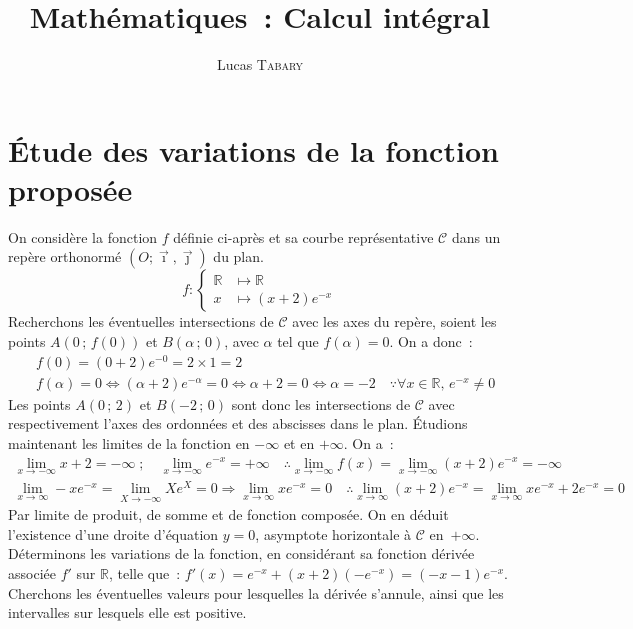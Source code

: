 \documentclass{article}
\title{\textbf{Mathématiques~: Calcul intégral}}
\author{Lucas \textsc{Tabary}}
\date{}
\begin{document}
 \maketitle
 \hrulefill

 \vspace{2cm}

 \hrulefill

\section{Étude des variations de la fonction proposée}
    On considère la fonction $f$ définie ci-après et sa courbe représentative $\mathscr{C}$ dans un repère orthonormé $(O;\vec\imath,\vec\jmath)$ du plan.
    \begin{displaymath}
        f:  \left\{
            \begin{array}{ll}
             \mathbb{R} \!&\mapsto \mathbb{R} \\
             x \!&\mapsto (x+2)e^{-x}
            \end{array}
            \right.
    \end{displaymath}
    Recherchons les éventuelles intersections de $\mathscr{C}$ avec les axes du repère, soient les points $A(0\,;\,f(0))$ et $B(\alpha\,;\,0)$, avec $\alpha$ tel que $f(\alpha) = 0$. On a donc~:
    \begin{align*}
     &f(0) = (0+2)e^{-0} = 2\times 1 = 2 \\
     &f(\alpha) = 0 \Leftrightarrow (\alpha + 2)e^{-\alpha}=0 \Leftrightarrow \alpha + 2 = 0\Leftrightarrow\alpha =-2\quad\because\forall x\in\mathbb{R},\, e^{-x}\neq 0
    \end{align*}
    Les points $A(0\,;\,2)$ et $B(-2\,;\,0)$ sont donc les intersections de $\mathscr{C}$ avec respectivement l'axes des ordonnées et des abscisses dans le plan. Étudions maintenant les limites de la fonction en $-\infty$ et en $+\infty$. On a~:
    \begin{gather*}
     \lim_{x\to -\infty} x+2 = -\infty\;;\quad \lim_{x \to -\infty} e^{-x} = +\infty\quad\therefore\lim_{x \to -\infty} f(x) = \lim_{x \to -\infty} (x+2)e^{-x} = -\infty \\
     \lim_{x\to \infty} -xe^{-x} = \lim_{X\to -\infty} Xe^X = 0 \Rightarrow \lim_{x\to \infty} xe^{-x} = 0\quad\therefore\lim_{x\to\infty} (x+2)e^{-x} = \lim_{x\to\infty} xe^{-x}+2e^{-x} = 0
    \end{gather*}
    Par limite de produit, de somme et de fonction composée. On en déduit l'existence d'une droite d'équation $y=0$, asymptote horizontale à $\mathscr{C}$ en~$+\infty$. Déterminons les variations de la fonction, en considérant sa fonction dérivée associée $f'$ sur $\mathbb{R}$, telle que~: $f'(x)=e^{-x} +(x+2)(-e^{-x})=(-x-1)e^{-x}$. Cherchons les éventuelles valeurs pour lesquelles la dérivée s'annule, ainsi que les intervalles sur lesquels elle est positive.
\end{document}
